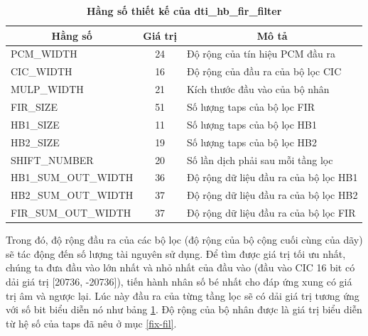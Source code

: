 \begin{table}[H]
    \centering
    \caption[Hằng số thiết kế của dti\_hb\_fir\_filter]{\bfseries\fontsize{12pt}{0pt}\selectfont Hằng số thiết kế của dti\_hb\_fir\_filter}
\begin{tabular}{|l|c|l|}
\hline
\multicolumn{1}{|c|}{\textbf{Hằng số}} & \textbf{Giá trị} & \multicolumn{1}{c|}{\textbf{Mô tả}} \\ \hline
PCM\_WIDTH  & 24 & Độ rộng của tín hiệu PCM đầu ra \\ \hline
CIC\_WIDTH  & 16 & Độ rộng của đầu ra của bộ lọc CIC \\ \hline
MULP\_WIDTH & 21 & Kích thước đầu vào của bộ nhân \\ \hline
FIR\_SIZE   & 51 & Số lượng taps của bộ lọc FIR    \\ \hline
HB1\_SIZE   & 11 & Số lượng taps của bộ lọc HB1    \\ \hline
HB2\_SIZE   & 19 & Số lượng taps của bộ lọc HB2    \\ \hline
SHIFT\_NUMBER   & 20 & Số lần dịch phải sau mỗi tầng lọc    \\ \hline
HB1\_SUM\_OUT\_WIDTH   & 36 & Độ rộng dữ liệu đầu ra của bộ lọc HB1    \\ \hline
HB2\_SUM\_OUT\_WIDTH   & 37 & Độ rộng dữ liệu đầu ra của bộ lọc HB2    \\ \hline
FIR\_SUM\_OUT\_WIDTH   & 37 & Độ rộng dữ liệu đầu ra của bộ lọc FIR    \\ \hline
\end{tabular}
    \label{hangso_hb_fir}
\end{table}

Trong đó, độ rộng đầu ra của các bộ lọc (độ rộng của bộ cộng cuối cùng của dãy) sẽ tác động đến số  lượng tài nguyên sử dụng. Để tìm được giá trị tối ưu nhất, chúng ta đưa đầu vào lớn nhất và nhỏ nhất của đầu vào (đầu vào CIC 16 bit có dải giá trị [20736, -20736]), tiến hành nhân số bé nhất cho đáp ứng xung có giá trị âm và ngược lại. Lúc này đầu ra của từng tầng lọc sẽ có dải giá trị tương ứng với số bit biểu diễn nó như bảng \ref{hangso_hb_fir}. Độ rộng của bộ nhân được là giá trị biểu diễn từ hệ số của taps đã nêu ở mục \ref{fix-fil}.

